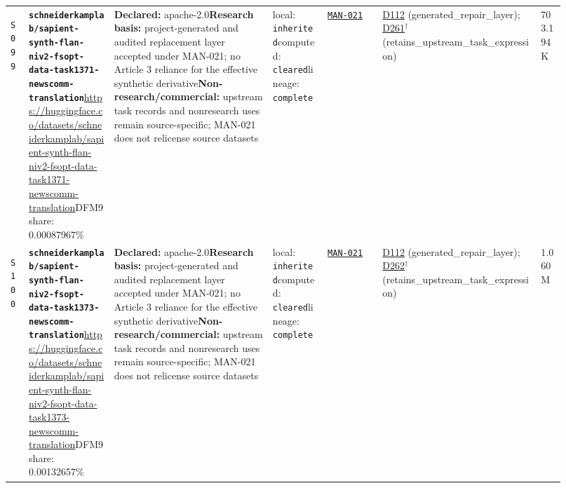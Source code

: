 \documentclass[9pt,a4paper]{article}
\newcommand{\srcid}[1]{\hypertarget{src:#1}{\texttt{#1}}}
\begin{document}
\begin{landscape}
\begin{longtable}{@{}L{0.03\linewidth}L{0.14\linewidth}L{0.26\linewidth}L{0.09\linewidth}L{0.09\linewidth}L{0.265\linewidth}L{0.045\linewidth}@{}}
\srcid{S099} & \textbf{\nolinkurl{schneiderkamplab/sapient-synth-flan-niv2-fsopt-data-task1371-newscomm-translation}}\newline \url{https://huggingface.co/datasets/schneiderkamplab/sapient-synth-flan-niv2-fsopt-data-task1371-newscomm-translation}\newline DFM9 share: 0.00087967\% & \textbf{Declared:} apache-2.0\newline \textbf{Research basis:} project-generated and audited replacement layer accepted under MAN-021; no Article 3 reliance for the effective synthetic derivative\newline \textbf{Non-research/commercial:} upstream task records and nonresearch uses remain source-specific; MAN-021 does not relicense source datasets & local: \texttt{inherited}\newline computed: \texttt{cleared}\newline lineage: \texttt{complete} & \hyperlink{manual:MAN-021}{\texttt{MAN-021}} & \hyperlink{dep:D112}{D112} (generated\_repair\_layer); \hyperlink{dep:D261}{D261}$^{\dagger}$ (retains\_upstream\_task\_expression) & 703.194K \\
\srcid{S100} & \textbf{\nolinkurl{schneiderkamplab/sapient-synth-flan-niv2-fsopt-data-task1373-newscomm-translation}}\newline \url{https://huggingface.co/datasets/schneiderkamplab/sapient-synth-flan-niv2-fsopt-data-task1373-newscomm-translation}\newline DFM9 share: 0.00132657\% & \textbf{Declared:} apache-2.0\newline \textbf{Research basis:} project-generated and audited replacement layer accepted under MAN-021; no Article 3 reliance for the effective synthetic derivative\newline \textbf{Non-research/commercial:} upstream task records and nonresearch uses remain source-specific; MAN-021 does not relicense source datasets & local: \texttt{inherited}\newline computed: \texttt{cleared}\newline lineage: \texttt{complete} & \hyperlink{manual:MAN-021}{\texttt{MAN-021}} & \hyperlink{dep:D112}{D112} (generated\_repair\_layer); \hyperlink{dep:D262}{D262}$^{\dagger}$ (retains\_upstream\_task\_expression) & 1.060M \\

\end{longtable}
\end{landscape}
\end{document}
